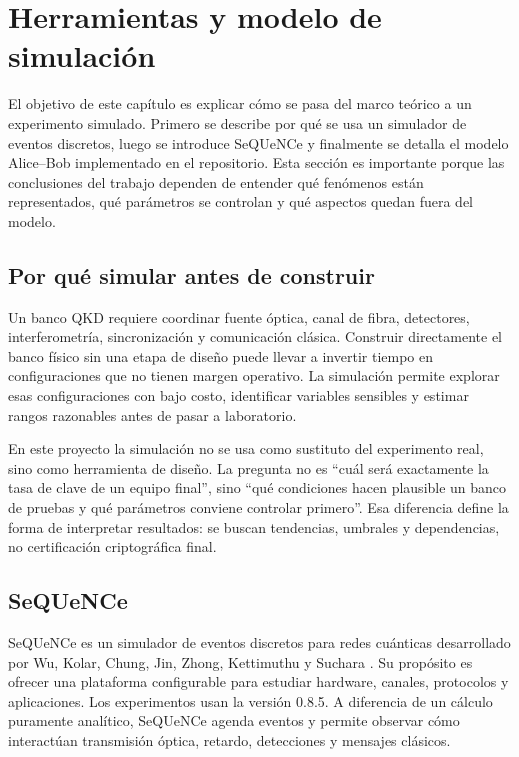 \chapter{Herramientas y modelo de simulación}
\label{chap:modelo}

El objetivo de este capítulo es explicar cómo se pasa del marco teórico a un experimento simulado. Primero se describe por qué se usa un simulador de eventos discretos, luego se introduce SeQUeNCe y finalmente se detalla el modelo Alice--Bob implementado en el repositorio. Esta sección es importante porque las conclusiones del trabajo dependen de entender qué fenómenos están representados, qué parámetros se controlan y qué aspectos quedan fuera del modelo.

\section{Por qué simular antes de construir}

Un banco QKD requiere coordinar fuente óptica, canal de fibra, detectores, interferometría, sincronización y comunicación clásica. Construir directamente el banco físico sin una etapa de diseño puede llevar a invertir tiempo en configuraciones que no tienen margen operativo. La simulación permite explorar esas configuraciones con bajo costo, identificar variables sensibles y estimar rangos razonables antes de pasar a laboratorio.

En este proyecto la simulación no se usa como sustituto del experimento real, sino como herramienta de diseño. La pregunta no es ``cuál será exactamente la tasa de clave de un equipo final'', sino ``qué condiciones hacen plausible un banco de pruebas y qué parámetros conviene controlar primero''. Esa diferencia define la forma de interpretar resultados: se buscan tendencias, umbrales y dependencias, no certificación criptográfica final.

\section{SeQUeNCe}

SeQUeNCe es un simulador de eventos discretos para redes cuánticas desarrollado por Wu, Kolar, Chung, Jin, Zhong, Kettimuthu y Suchara \cite{wu2021sequence}. Su propósito es ofrecer una plataforma configurable para estudiar hardware, canales, protocolos y aplicaciones. Los experimentos usan la versión 0.8.5. A diferencia de un cálculo puramente analítico, SeQUeNCe agenda eventos y permite observar cómo interactúan transmisión óptica, retardo, detecciones y mensajes clásicos.

